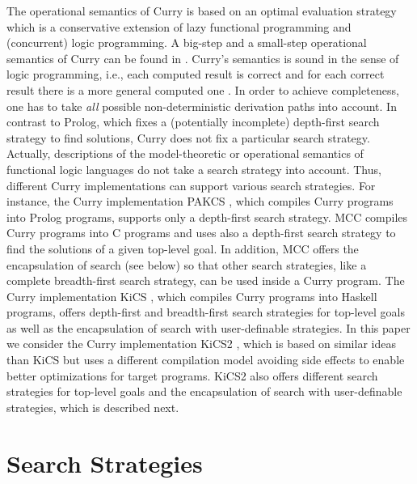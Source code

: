 \documentclass[english]{lni}
\begin{document}
The operational semantics of Curry is based on an optimal evaluation strategy
\cite{AntoyEchahedHanus00JACM} which is a conservative extension
of lazy functional programming and (concurrent) logic programming.
A big-step and a small-step operational semantics of Curry
can be found in \cite{AlbertHanusHuchOliverVidal05}.
Curry's semantics is sound in the sense of logic programming,
i.e., each computed result is correct and for each
correct result there is a more general computed one
\cite{AntoyEchahedHanus00JACM}.
In order to achieve completeness,
one has to take \emph{all} possible non-deterministic derivation paths
into account. In contrast to Prolog, which fixes
a (potentially incomplete) depth-first search strategy to find solutions,
Curry does not fix a particular search strategy.
Actually, descriptions of the model-theoretic \cite{GonzalezEtAl99}
or operational \cite{AlbertHanusHuchOliverVidal05}
semantics of functional logic languages do not take
a search strategy into account.
Thus, different Curry implementations
can support various search strategies.
For instance, the Curry implementation PAKCS \cite{Hanus10PAKCS},
which compiles Curry programs into Prolog programs,
supports only a depth-first search strategy.
MCC \cite{Lux99FLOPS} compiles Curry programs into C programs
and uses also a depth-first search strategy to find the
solutions of a given top-level goal.
In addition, MCC offers the encapsulation of search
(see below) so that other search strategies,
like a complete breadth-first search strategy, can be used
inside a Curry program.
The Curry implementation KiCS \cite{BrasselHuch07,BrasselHuch09},
which compiles Curry programs into Haskell programs,
offers depth-first and breadth-first search strategies
for top-level goals as well as the encapsulation of search
with user-definable strategies.
In this paper we consider the Curry implementation
KiCS2 \cite{BrasselHanusPeemoellerReck11},
which is based on similar ideas than KiCS but uses
a different compilation model avoiding side effects
to enable better optimizations for target programs.
KiCS2 also offers different search strategies for top-level goals
and the encapsulation of search with user-definable strategies,
which is described next.


\section{Search Strategies}
\label{sec:strategies}
\end{document}
